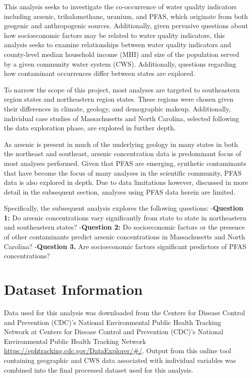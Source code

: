 \documentclass[12pt,]{article}
\begin{document}
This analysis seeks to investigate the co-occurrence of water quality
indicators including arsenic, trihalomethane, uranium, and PFAS, which
originate from both geogenic and anthropogenic sources. Additionally,
given pervasive questions about how socioeconomic factors may be related
to water quality indicators, this analysis seeks to examine
relationships between water quality indicators and county-level median
household income (MHI) and size of the population served by a given
community water system (CWS). Additionally, questions regarding how
contaminant occurrences differ between states are explored.

To narrow the scope of this project, most analyses are targeted to
southeastern region states and northeastern region states. These regions
were chosen given their differences in climate, geology, and demographic
makeup. Additionally, individual case studies of Massachusetts and North
Carolina, selected following the data exploration phase, are explored in
further depth.

As arsenic is present in much of the underlying geology in many states
in both the northeast and southeast, arsenic concentration data is
predominant focus of most analyses performed. Given that PFAS are
emerging, synthetic contaminants that have become the focus of many
analyses in the scientific community, PFAS data is also explored in
depth. Due to data limitations however, discussed in more detail in the
subsequent section, analyses using PFAS data herein are limited.

Specifically, the subsequent analysis explores the following questions:
-\textbf{Question 1:} Do arsenic concentrations vary significantly from
state to state in northeastern and southeastern states?
-\textbf{Question 2:} Do socioeconomic factors or the presence of other
contaminants predict arsenic concentrations in Massachusetts and North
Carolina? -\textbf{Question 3.} Are socioeconomic factors significant
predictors of PFAS concentrations?

\newpage

\hypertarget{dataset-information}{%
\section{Dataset Information}\label{dataset-information}}

Data used for this analysis was downloaded from the Centers for Disease
Control and Prevention (CDC)'s National Environmental Public Health
Tracking Network at Centers for Disease Control and Prevention (CDC)'s
National Environmental Public Health Tracking Network
\url{https://ephtracking.cdc.gov/DataExplorer/\#/}. Output from this
online tool containing geographic and CWS data associated with
individual variables was combined into the final processed dataset used
for this analysis.
\end{document}
